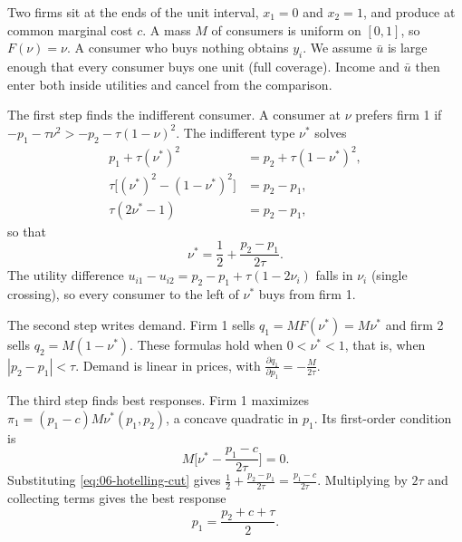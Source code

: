 \begin{example}\label{ex:06-hotelling}
Two firms sit at the ends of the unit interval, $x_1 = 0$ and $x_2 = 1$, and produce at common marginal
cost $c$. A mass $M$ of consumers is uniform on $[0,1]$, so $F(\nu) = \nu$. A consumer who buys nothing
obtains $y_i$. We assume $\bar u$ is large enough that every consumer buys one unit (full coverage).
Income and $\bar u$ then enter both inside utilities and cancel from the comparison.

The first step finds the indifferent consumer. A consumer at $\nu$ prefers firm 1 if
$-p_1 - \tau\nu^2 > -p_2 - \tau(1-\nu)^2$. The indifferent type $\nu^*$ solves
\begin{align*}
  p_1 + \tau(\nu^*)^2 &= p_2 + \tau(1-\nu^*)^2,\\
  \tau\big[(\nu^*)^2 - (1-\nu^*)^2\big] &= p_2 - p_1,\\
  \tau(2\nu^* - 1) &= p_2 - p_1,
\end{align*}
so that
\begin{equation}\label{eq:06-hotelling-cut}
  \nu^* = \frac{1}{2} + \frac{p_2 - p_1}{2\tau}.
\end{equation}
The utility difference $u_{i1} - u_{i2} = p_2 - p_1 + \tau(1 - 2\nu_i)$ falls in $\nu_i$ (single
crossing), so every consumer to the left of $\nu^*$ buys from firm 1.

The second step writes demand. Firm 1 sells $q_1 = M F(\nu^*) = M\nu^*$ and firm 2 sells
$q_2 = M(1 - \nu^*)$. These formulas hold when $0 < \nu^* < 1$, that is, when $|p_2 - p_1| < \tau$.
Demand is linear in prices, with $\frac{\partial q_1}{\partial p_1} = -\frac{M}{2\tau}$.

The third step finds best responses. Firm 1 maximizes $\pi_1 = (p_1 - c)M\nu^*(p_1, p_2)$, a concave
quadratic in $p_1$. Its first-order condition is
\begin{equation*}
  M\Big[\nu^* - \frac{p_1 - c}{2\tau}\Big] = 0.
\end{equation*}
Substituting \eqref{eq:06-hotelling-cut} gives $\frac{1}{2} + \frac{p_2 - p_1}{2\tau} = \frac{p_1 - c}{2\tau}$.
Multiplying by $2\tau$ and collecting terms gives the best response
\begin{equation*}
  p_1 = \frac{p_2 + c + \tau}{2}.
\end{equation*}


\end{example}
